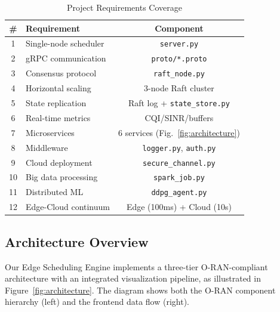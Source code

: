\documentclass[journal]{IEEEtran}
\begin{document}
\begin{table}[t]
\centering
\caption{Project Requirements Coverage}
\label{tab:requirements}
\begin{tabular}{@{}clc@{}}
\toprule
\textbf{\#} & \textbf{Requirement} & \textbf{Component} \\
\midrule
1 & Single-node scheduler & \texttt{server.py} \\
2 & gRPC communication & \texttt{proto/*.proto} \\
3 & Consensus protocol & \texttt{raft\_node.py} \\
4 & Horizontal scaling & 3-node Raft cluster \\
5 & State replication & Raft log + \texttt{state\_store.py} \\
6 & Real-time metrics & CQI/SINR/buffers \\
7 & Microservices & 6 services (Fig.~\ref{fig:architecture}) \\
8 & Middleware & \texttt{logger.py}, \texttt{auth.py} \\
9 & Cloud deployment & \texttt{secure\_channel.py} \\
10 & Big data processing & \texttt{spark\_job.py} \\
11 & Distributed ML & \texttt{ddpg\_agent.py} \\
12 & Edge-Cloud continuum & Edge (100ms) + Cloud (10s) \\
\bottomrule
\end{tabular}
\end{table}

\subsection{Architecture Overview}

Our Edge Scheduling Engine implements a three-tier O-RAN-compliant architecture with an integrated visualization pipeline, as illustrated in Figure~\ref{fig:architecture}. The diagram shows both the O-RAN component hierarchy (left) and the frontend data flow (right).
\end{document}
